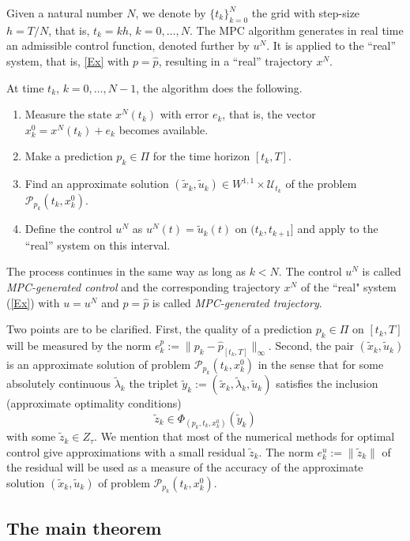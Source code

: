 \documentclass[11pt]{article}
\newcommand{\be}{\begin{equation}}
\newcommand{\ee}{\end{equation}}
\newcommand{\U}{\mathcal U}
\newcommand{\p}{{\mathcal P}}
\newcommand{\bino}{\bigskip\noindent}
\begin{document}
Given a natural number $N$, we denote by $\{t_k\}_{k=0}^N$ the grid with step-size $h=T/N$, that is, $t_k=kh$, $k=0,\ldots,N$. The MPC algorithm generates in real time an admissible control function, denoted further by $u^N$. It is applied to the ``real'' system, that is, \eqref{Ex} with $p=\hat p$, resulting in a ``real'' trajectory $x^N$.

At time $t_k$, $k=0,\ldots,N-1$, the algorithm does the following.
\begin{enumerate}
\item Measure the state $x^N(t_k)$ with error $e_k$, that is, the vector $x_k^0=x^N(t_k)+e_k$ becomes available.
\item Make a prediction $p_k\in\Pi$ for the time horizon $[t_k,T]$.
\item Find an approximate solution $(\tilde x_k,\tilde u_k)\in W^{1,1}\times \U_{t_k}$ of the problem $\mathcal P_{p_k}(t_k,x_k^0)$.
\item Define the control $u^N$ as $u^N(t)=\tilde u_k(t)$ on $(t_k,t_{k+1}]$ and apply to the ``real'' system on this interval.
\end{enumerate}


The process continues in the same way as long as $k < N$. The control $u^N$ is called {\em MPC-generated control}
and the corresponding trajectory $x^N$ of the ``real" system (\ref{Ex}) with $u = u^N$ and $p = \hat p$
is called {\em MPC-generated trajectory}.

\bino
Two points are to be clarified. First, the quality of a prediction $p_k \in \varPi$ on $[t_k,T]$ will be measured by the 
norm $e_k^p :=  \| p_k - \hat p_{[t_k,T]}\|_\infty$. Second, the pair $(\tilde x_k, \tilde u_k)$ is an approximate solution  of
problem $\p_{p_k}(t_k, x_k^0)$ in the sense that for some absolutely continuous $\tilde \lambda_k$
the triplet $\tilde y_k := (\tilde x_k, \tilde \lambda_k, \tilde u_k)$
satisfies the inclusion (approximate optimality conditions) 
\be \label{LRrez}
          \tilde z_k \in \Phi_{(p_k,t_k, x_k^0)}(\tilde y_k)
\ee
with some $\tilde z_k \in Z_\tau$. 
We mention that most of the numerical methods for optimal control give approximations 
with a small residual $\tilde z_k$. The norm $e_k^{u} := \| \tilde z_k \|$ of the residual will be used 
as a measure of the accuracy of the approximate solution  $(\tilde x_k,\tilde u_k)$ of problem $\p_{p_k}(t_k, x_k^0)$.  
 
\subsection{The main theorem} \label{SS_main}
\end{document}
